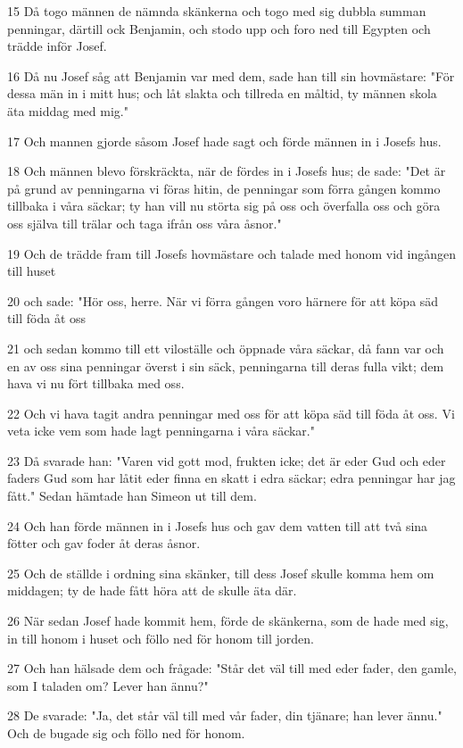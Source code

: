 \par 15 Då togo männen de nämnda skänkerna och togo med sig dubbla summan penningar, därtill ock Benjamin, och stodo upp och foro ned till Egypten och trädde inför Josef.
\par 16 Då nu Josef såg att Benjamin var med dem, sade han till sin hovmästare: "För dessa män in i mitt hus; och låt slakta och tillreda en måltid, ty männen skola äta middag med mig."
\par 17 Och mannen gjorde såsom Josef hade sagt och förde männen in i Josefs hus.
\par 18 Och männen blevo förskräckta, när de fördes in i Josefs hus; de sade: "Det är på grund av penningarna vi föras hitin, de penningar som förra gången kommo tillbaka i våra säckar; ty han vill nu störta sig på oss och överfalla oss och göra oss själva till trälar och taga ifrån oss våra åsnor."
\par 19 Och de trädde fram till Josefs hovmästare och talade med honom vid ingången till huset
\par 20 och sade: "Hör oss, herre. När vi förra gången voro härnere för att köpa säd till föda åt oss
\par 21 och sedan kommo till ett viloställe och öppnade våra säckar, då fann var och en av oss sina penningar överst i sin säck, penningarna till deras fulla vikt; dem hava vi nu fört tillbaka med oss.
\par 22 Och vi hava tagit andra penningar med oss för att köpa säd till föda åt oss. Vi veta icke vem som hade lagt penningarna i våra säckar."
\par 23 Då svarade han: "Varen vid gott mod, frukten icke; det är eder Gud och eder faders Gud som har låtit eder finna en skatt i edra säckar; edra penningar har jag fått." Sedan hämtade han Simeon ut till dem.
\par 24 Och han förde männen in i Josefs hus och gav dem vatten till att två sina fötter och gav foder åt deras åsnor.
\par 25 Och de ställde i ordning sina skänker, till dess Josef skulle komma hem om middagen; ty de hade fått höra att de skulle äta där.
\par 26 När sedan Josef hade kommit hem, förde de skänkerna, som de hade med sig, in till honom i huset och föllo ned för honom till jorden.
\par 27 Och han hälsade dem och frågade: "Står det väl till med eder fader, den gamle, som I taladen om? Lever han ännu?"
\par 28 De svarade: "Ja, det står väl till med vår fader, din tjänare; han lever ännu." Och de bugade sig och föllo ned för honom.
